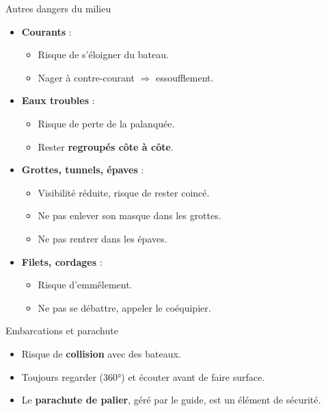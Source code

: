 \begin{frame}{Autres dangers du milieu}
  \begin{itemize}
    \item \textbf{Courants} :
          \begin{itemize}
            \item Risque de s’éloigner du bateau.
            \item Nager à contre-courant $\Rightarrow$ essoufflement.
          \end{itemize}
    \item \textbf{Eaux troubles} :
          \begin{itemize}
            \item Risque de perte de la palanquée.
            \item Rester \textbf{regroupés côte à côte}.
          \end{itemize}
    \item \textbf{Grottes, tunnels, épaves} :
          \begin{itemize}
            \item Visibilité réduite, risque de rester coincé.
            \item Ne pas enlever son masque dans les grottes.
            \item Ne pas rentrer dans les épaves.
          \end{itemize}
    \item \textbf{Filets, cordages} :
          \begin{itemize}
            \item Risque d’emmêlement.
            \item Ne pas se débattre, appeler le coéquipier.
          \end{itemize}
  \end{itemize}
\end{frame}

\begin{frame}{Embarcations et parachute}
  \begin{itemize}
    \item Risque de \textbf{collision} avec des bateaux.
    \item Toujours regarder (360°) et écouter avant de faire surface.
    \item Le \textbf{parachute de palier}, géré par le guide, est un élément de sécurité.
  \end{itemize}
\end{frame}

